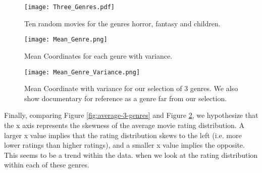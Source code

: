 \begin{figure}[H]
\centering
\texttt{[image: Three\_Genres.pdf]}
 \caption{Ten random movies for the genres horror, fantasy and children. }
\label{fig:tg}
\end{figure}

\begin{figure}[H]
\centering
\texttt{[image: Mean\_Genre.png]}
 \caption{Mean Coordinates for each genre with variance.}
\label{fig:tgMeanGenre}
\end{figure}

\begin{figure}[H]
\centering
\texttt{[image: Mean\_Genre\_Variance.png]}
 \caption{Mean Coordinate with variance for our selection of 3 genres. We also show documentary for reference as a genre far from our selection.}
\label{fig:tgMV}
\end{figure}

Finally, comparing Figure \ref{fig:average-3-genres} and Figure \ref{fig:tgMeanGenre}, we hypothesize that the x axis represents the skewness of the average movie rating distribution. A larger x value implies that the rating distribution skews to the left (i.e. more lower ratings than higher ratings), and a smaller x value implies the opposite. This seems to be a trend within the data. when we look at the rating distribution within each of these genres. 


